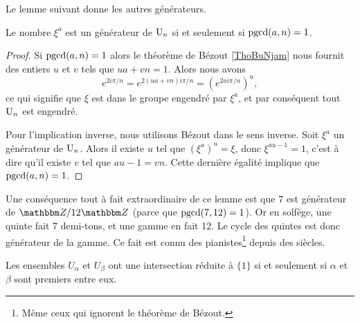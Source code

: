 Le lemme suivant donne les autres générateurs.
\begin{lemma}   \label{LemcFTNMa}
    Le nombre \( \xi^a\) est un générateur de \( \operatorname{U}_n\) si et seulement si \( \operatorname{pgcd}(a,n)=1\).
\end{lemma}

\begin{proof}
    Si \( \operatorname{pgcd}(a,n)=1\) alors le théorème de Bézout \ref{ThoBuNjam} nous fournit des entiers \( u\) et \( v\) tels que \( ua+vn=1\). Alors nous avons
    \begin{equation}
        e^{2i\pi /n}= e^{2(ua+vn)i\pi/n}=( e^{2ai\pi/n})^u,
    \end{equation}
    ce qui signifie que \( \xi\) est dans le groupe engendré par \( \xi^a\), et par conséquent tout \( \operatorname{U}_n\) est engendré.

    Pour l'implication inverse, nous utilisons Bézout dans le sens inverse. Soit \( \xi^a\) un générateur de \( \operatorname{U}_n\). Alors il existe \( u\) tel que \( (\xi^a)^u=\xi\), donc \( \xi^{au-1}=1\), c'est à dire qu'il existe \( v\) tel que \( au-1=vn\). Cette dernière égalité implique que \( \operatorname{pgcd}(a,n)=1\).
\end{proof}

\begin{example}
Une conséquence tout à fait extraordinaire de ce lemme est que \( 7\) est générateur de \( \eZ/12\eZ\) (parce que \( \operatorname{pgcd}(7,12)=1\)). Or en solfège, une quinte fait \( 7\) demi-tons, et une gamme en fait 12. Le cycle des quintes est donc générateur de la gamme\cite{YDXsAM}. Ce fait est connu des pianistes\footnote{Même ceux qui ignorent le théorème de Bézout.} depuis des siècles.
\end{example}

\begin{proposition}
    Les ensembles \( U_{\alpha}\) et \( U_{\beta}\) ont une intersection réduite à \( \{ 1 \}\) si et seulement si \( \alpha\) et \( \beta\) sont premiers entre eux.
\end{proposition}

